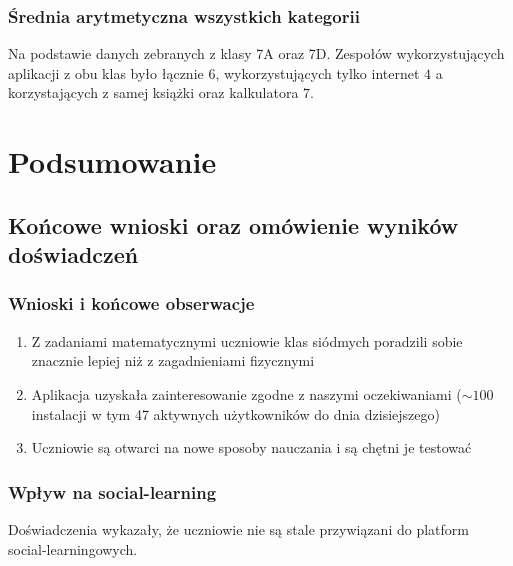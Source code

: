 \documentclass[10pt]{beamer}
\begin{document}
\begin{frame}
\frametitle{Średnia arytmetyczna wszystkich kategorii}

\begin{figure}[H]


\end{figure}

\tiny Na podstawie danych zebranych z klasy 7A oraz 7D. Zespołów wykorzystujących aplikacji z obu klas było łącznie $6$, wykorzystujących tylko internet $4$ a korzystających z samej książki oraz kalkulatora $7$.

\end{frame}

\section{Podsumowanie}
\subsection{Końcowe wnioski oraz omówienie wyników doświadczeń}

\begin{frame}
  \frametitle{Wnioski i końcowe obserwacje}
  \begin{enumerate}
    \item Z zadaniami matematycznymi uczniowie klas siódmych poradzili sobie znacznie lepiej niż z zagadnieniami fizycznymi
    \item Aplikacja uzyskała zainteresowanie zgodne z naszymi oczekiwaniami ($\sim 100$ instalacji w tym 47 aktywnych użytkowników do dnia dzisiejszego)
    \item Uczniowie są otwarci na nowe sposoby nauczania i są chętni je testować
  \end{enumerate}
\end{frame}

\begin{frame}
  \frametitle{Wpływ na social-learning}
  Doświadczenia wykazały, że uczniowie nie są stale przywiązani do platform social-learningowych.
\end{frame}
\end{document}
